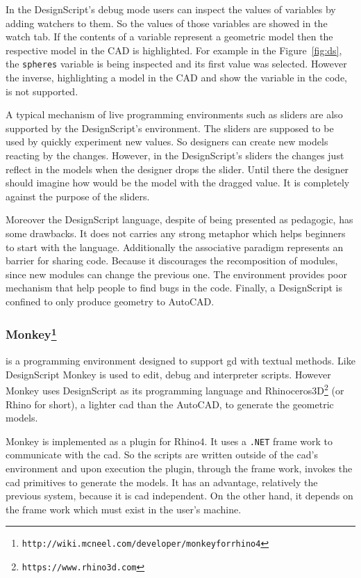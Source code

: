 In the DesignScript's debug mode users can inspect the values of variables by adding watchers to them. So the values of those variables are showed in the watch tab. If the contents of a variable represent a geometric model then the respective model in the CAD is highlighted. For example in the Figure~\ref{fig:ds}, the \texttt{spheres} variable is being inspected and its first value was selected. However the inverse, highlighting a model in the CAD and show the variable in the code, is not supported.

A typical mechanism of live programming environments such as sliders are also supported by the DesignScript's environment. The sliders are supposed to be used by quickly experiment new values. So designers can create new models reacting by the changes. However, in the DesignScript's sliders the changes just reflect in the models when the designer drops the slider. Until there the designer should imagine how would be the model with the dragged value. It is completely against the purpose of the sliders.

Moreover the DesignScript language, despite of being presented as pedagogic, has some drawbacks. It does not carries any strong metaphor which helps beginners to start with the language. Additionally the associative paradigm represents an barrier for sharing code. Because it discourages the recomposition of modules, since new modules can change the previous one. The environment provides poor mechanism that help people to find bugs in the code. Finally, a DesignScript is confined to only produce geometry to AutoCAD.
\subsubsection{Monkey\protect\footnote{\texttt{http://wiki.mcneel.com/developer/monkeyforrhino4}}} is a programming environment designed to support \ac{gd} with textual methods. Like DesignScript Monkey is used to edit, debug and interpreter scripts. However Monkey uses DesignScript as its programming language and Rhinoceros3D\footnote{\label{rhin}\texttt{https://www.rhino3d.com}} (or Rhino for short), a lighter \ac{cad} than the AutoCAD, to generate the geometric models.

Monkey is implemented as a plugin for Rhino4. It uses a \texttt{.NET} frame work to communicate with the \ac{cad}. So the scripts are written outside of the \ac{cad}'s environment and upon execution the plugin, through the frame work, invokes the \ac{cad} primitives to generate the models. It has an advantage, relatively the previous system, because it is \ac{cad} independent. On the other hand, it depends on the frame work which must exist in the user's machine.


